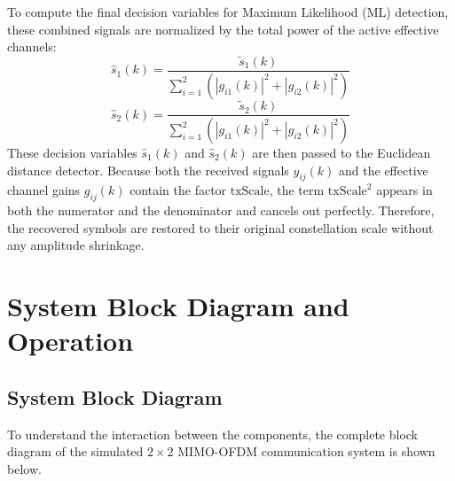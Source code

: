 \documentclass[a4paper]{article}
\begin{document}
To compute the final decision variables for Maximum Likelihood (ML) detection, these combined signals are normalized by the total power of the active effective channels:
\begin{equation}
\hat{s}_1(k) = \frac{\tilde{s}_1(k)}{\sum_{i=1}^{2} \left( |g_{i1}(k)|^2 + |g_{i2}(k)|^2 \right)}
\end{equation}
\begin{equation}
\hat{s}_2(k) = \frac{\tilde{s}_2(k)}{\sum_{i=1}^{2} \left( |g_{i1}(k)|^2 + |g_{i2}(k)|^2 \right)}
\end{equation}
These decision variables $\hat{s}_1(k)$ and $\hat{s}_2(k)$ are then passed to the Euclidean distance detector. Because both the received signals $y_{ij}(k)$ and the effective channel gains $g_{ij}(k)$ contain the factor $\text{txScale}$, the term $\text{txScale}^2$ appears in both the numerator and the denominator and cancels out perfectly. Therefore, the recovered symbols are restored to their original constellation scale without any amplitude shrinkage. 

\section{System Block Diagram and Operation}

\subsection{System Block Diagram}
To understand the interaction between the components, the complete block diagram of the simulated $2 \times 2$ MIMO-OFDM communication system is shown below.
\end{document}
